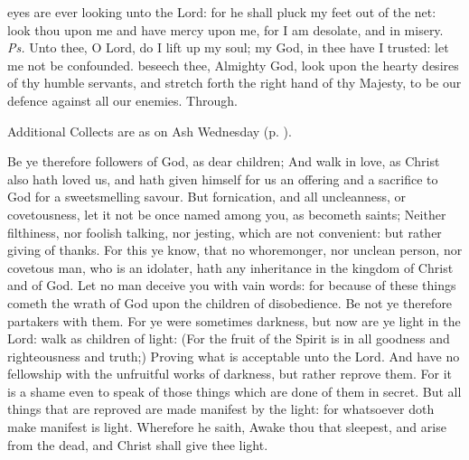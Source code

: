 \introit
{} eyes are ever looking unto the Lord: for he shall pluck my feet out of the net: look thou upon me and have mercy upon me, for I am desolate, and in misery. \textit{Ps.} Unto thee, O Lord, do I lift up my soul; my God, in thee have I trusted: let me not be confounded.
\collect
{} beseech thee, Almighty God, look upon the hearty desires of thy humble servants, and stretch forth the right hand of thy Majesty, to be our defence against all our enemies. Through.
\begin{rubric}
    Additional Collects are as on Ash Wednesday (p. \pageref{AshWednesdayMassCollect}).
\end{rubric}
 Be ye therefore followers of God, as dear children; And walk in love, as Christ also hath loved us, and hath given himself for us an offering and a sacrifice to God for a sweetsmelling savour. But fornication, and all uncleanness, or covetousness, let it not be once named among you, as becometh saints; Neither filthiness, nor foolish talking, nor jesting, which are not convenient: but rather giving of thanks. For this ye know, that no whoremonger, nor unclean person, nor covetous man, who is an idolater, hath any inheritance in the kingdom of Christ and of God. Let no man deceive you with vain words: for because of these things cometh the wrath of God upon the children of disobedience. Be not ye therefore partakers with them. For ye were sometimes darkness, but now are ye light in the Lord: walk as children of light: (For the fruit of the Spirit is in all goodness and righteousness and truth;) Proving what is acceptable unto the Lord. And have no fellowship with the unfruitful works of darkness, but rather reprove them. For it is a shame even to speak of those things which are done of them in secret. But all things that are reproved are made manifest by the light: for whatsoever doth make manifest is light. Wherefore he saith, Awake thou that sleepest, and arise from the dead, and Christ shall give thee light.



